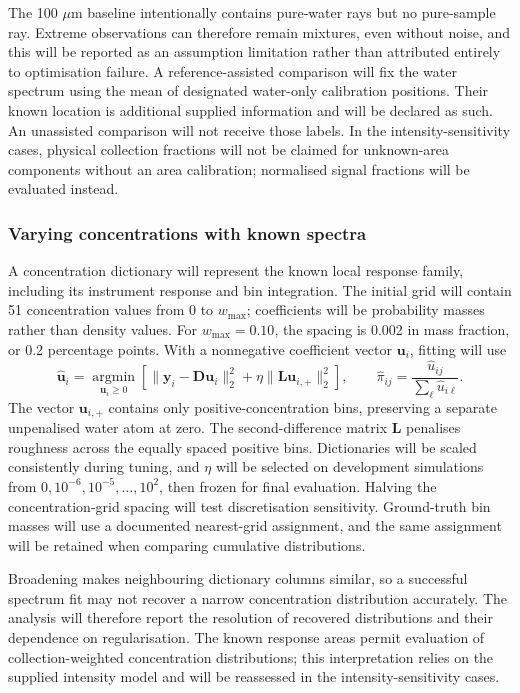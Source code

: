 \documentclass[11pt]{article}
\newcommand{\wmax}{w_{\max}}
\begin{document}
The 100 $\mu\mathrm m$ baseline intentionally contains pure-water rays but no pure-sample ray. Extreme observations can therefore remain mixtures, even without noise, and this will be reported as an assumption limitation rather than attributed entirely to optimisation failure. A reference-assisted comparison will fix the water spectrum using the mean of designated water-only calibration positions. Their known location is additional supplied information and will be declared as such. An unassisted comparison will not receive those labels. In the intensity-sensitivity cases, physical collection fractions will not be claimed for unknown-area components without an area calibration; normalised signal fractions will be evaluated instead.

\subsubsection{Varying concentrations with known spectra}

A concentration dictionary will represent the known local response family, including its instrument response and bin integration. The initial grid will contain 51 concentration values from 0 to $\wmax$; coefficients will be probability masses rather than density values. For $\wmax=0.10$, the spacing is 0.002 in mass fraction, or 0.2 percentage points. With a nonnegative coefficient vector $\mathbf u_i$, fitting will use
\begin{equation}
 \widehat{\mathbf u}_i=\underset{\mathbf u_i\geq0}{\operatorname{argmin}}
 \left[\|\mathbf y_i-\mathbf D\mathbf u_i\|_2^2+
 \eta\|\mathbf L\mathbf u_{i,+}\|_2^2\right],\qquad
 \widehat\pi_{ij}=\frac{\widehat u_{ij}}{\sum_\ell\widehat u_{i\ell}}.
 \label{eq:regularised_distribution}
\end{equation}
The vector $\mathbf u_{i,+}$ contains only positive-concentration bins, preserving a separate unpenalised water atom at zero. The second-difference matrix $\mathbf L$ penalises roughness across the equally spaced positive bins. Dictionaries will be scaled consistently during tuning, and $\eta$ will be selected on development simulations from $0,10^{-6},10^{-5},\ldots,10^2$, then frozen for final evaluation. Halving the concentration-grid spacing will test discretisation sensitivity. Ground-truth bin masses will use a documented nearest-grid assignment, and the same assignment will be retained when comparing cumulative distributions.

Broadening makes neighbouring dictionary columns similar, so a successful spectrum fit may not recover a narrow concentration distribution accurately. The analysis will therefore report the resolution of recovered distributions and their dependence on regularisation. The known response areas permit evaluation of collection-weighted concentration distributions; this interpretation relies on the supplied intensity model and will be reassessed in the intensity-sensitivity cases.
\end{document}
